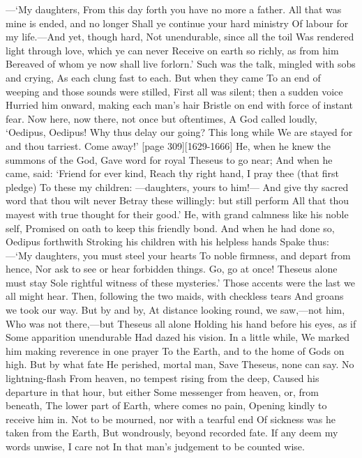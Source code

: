 \documentclass[11pt,letter]{book}
\begin{document}
\par  —‘My daughters, From this day forth you have no more a father. All that was mine is ended, and no longer Shall ye continue your hard ministry Of labour for my life.—And yet, though hard, Not unendurable, since all the toil Was rendered light through love, which ye can never Receive on earth so richly, as from him Bereaved of whom ye now shall live forlorn.’ Such was the talk, mingled with sobs and crying, As each clung fast to each. But when they came To an end of weeping and those sounds were stilled, First all was silent; then a sudden voice Hurried him onward, making each man’s hair Bristle on end with force of instant fear. Now here, now there, not once but oftentimes, A God called loudly, ‘Oedipus, Oedipus! Why thus delay our going? This long while We are stayed for and thou tarriest. Come away!’ [page 309][1629-1666] He, when he knew the summons of the God, Gave word for royal Theseus to go near; And when he came, said:  ‘Friend for ever kind, Reach thy right hand, I pray thee (that first pledge) To these my children: —daughters, yours to him!— And give thy sacred word that thou wilt never Betray these willingly:  but still perform All that thou mayest with true thought for their good.’ He, with grand calmness like his noble self, Promised on oath to keep this friendly bond. And when he had done so, Oedipus forthwith Stroking his children with his helpless hands Spake thus: —‘My daughters, you must steel your hearts To noble firmness, and depart from hence, Nor ask to see or hear forbidden things. Go, go at once! Theseus alone must stay Sole rightful witness of these mysteries.’ Those accents were the last we all might hear. Then, following the two maids, with checkless tears And groans we took our way. But by and by, At distance looking round, we saw,—not him, Who was not there,—but Theseus all alone Holding his hand before his eyes, as if Some apparition unendurable Had dazed his vision. In a little while, We marked him making reverence in one prayer To the Earth, and to the home of Gods on high. But by what fate He perished, mortal man, Save Theseus, none can say. No lightning-flash From heaven, no tempest rising from the deep, Caused his departure in that hour, but either Some messenger from heaven, or, from beneath, The lower part of Earth, where comes no pain, Opening kindly to receive him in. Not to be mourned, nor with a tearful end Of sickness was he taken from the Earth, But wondrously, beyond recorded fate. If any deem my words unwise, I care not In that man’s judgement to be counted wise.
\end{document}
